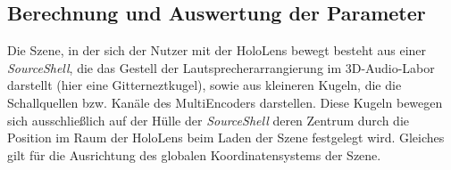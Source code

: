 \documentclass[11pt, titlepage, fleqn]{report}
\begin{document}
            \subsection{Berechnung und Auswertung der Parameter}
            \label{sec:3.2.3}
                Die Szene, in der sich der Nutzer mit der HoloLens bewegt 
                besteht aus einer \textit{SourceShell}, die das Gestell der 
                Lautsprecherarrangierung im 3D-Audio-Labor darstellt (hier eine 
                Gitterneztkugel), sowie aus kleineren Kugeln, die die 
                Schallquellen bzw. Kanäle des MultiEncoders darstellen. Diese Kugeln bewegen sich ausschließlich auf der Hülle der 
                \textit{SourceShell} deren Zentrum durch die Position im Raum 
                der HoloLens beim Laden der Szene festgelegt wird. Gleiches 
                gilt für die Ausrichtung des globalen Koordinatensystems der Szene.
\end{document}

